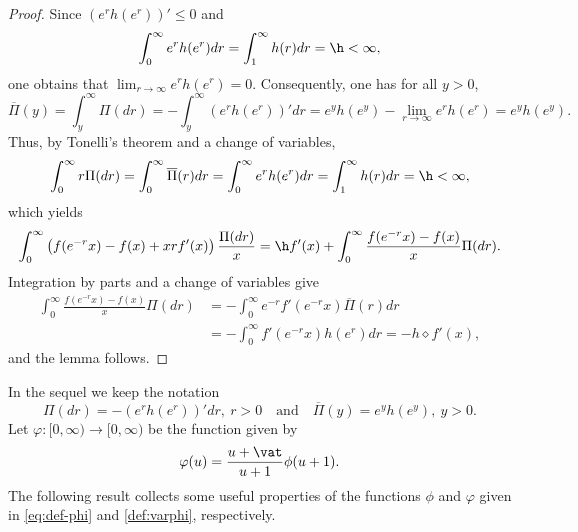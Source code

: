 \begin{proof}
Since $(e^rh(e^r))' \le 0$ and
\begin{equation*}
\int_0^\infty e^rh(e^r)dr = \int_1^\infty h(r)dr = \h < \infty,
\end{equation*}
one obtains that $\lim_{r \to \infty} e^r h(e^r) = 0$. Consequently, one has for all $y>0$,
\begin{equation*}
\overline{\Pi}(y) = \int_y^\infty \Pi(dr) = -\int_y^\infty (e^rh(e^r))' dr = e^yh(e^y) - \lim_{r \to \infty} e^r h(e^r) = e^yh(e^y).
\end{equation*}
Thus, by Tonelli's theorem and a change of variables,
\begin{equation*}
\int_0^\infty r\Pi(dr) = \int_0^\infty \overline{\Pi}(r)dr = \int_0^{\infty} e^r h(e^r) dr = \int_1^\infty h(r)dr = \h < \infty,
\end{equation*}
which yields
\begin{equation*}
\int_{0}^{\infty} \left(f(e^{-r}x)-f(x)+xrf'(x)\right)\frac{\Pi(dr)}{x} = \h f'(x) + \int_0^\infty \frac{f(e^{-r}x)-f(x)}{x} \Pi(dr).
\end{equation*}
Integration by parts and a change of variables give
\begin{align*}
\int_0^\infty \frac{f(e^{-r}x)-f(x)}{x} \Pi(dr) &= -\int_0^\infty e^{-r} f'(e^{-r}x) \overline{\Pi}(r)dr\\
&= -\int_0^\infty f'(e^{-r}x)h(e^r)dr = -h \diamond f'(x),
\end{align*}
and the lemma follows.
\end{proof}

In the sequel we keep the notation
\[
\Pi(dr) = -(e^rh(e^r))'dr,\ r > 0\quad\text{and}\quad \overline{\Pi}(y) = e^y h(e^y),\ y > 0.
\]
Let $\varphi: [0,\infty) \to [0,\infty)$ be the function given by
\begin{equation}
\label{def:varphi}
\varphi(u) = \frac{u+\vat}{u+1}\phi(u+1).
\end{equation}
The following result collects some useful properties of the functions $\phi$ and $\varphi$
given in \eqref{eq:def-phi} and \eqref{def:varphi}, respectively.

